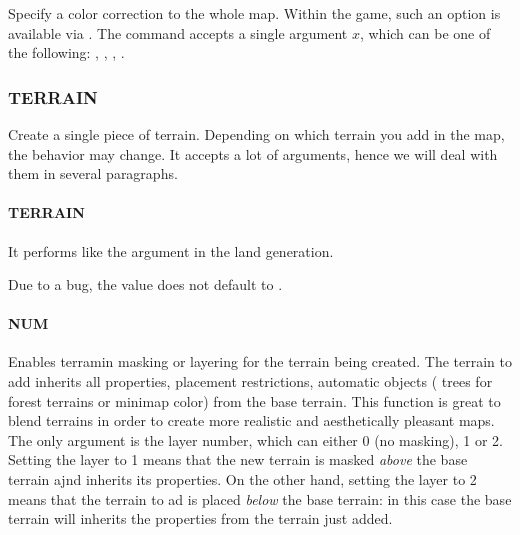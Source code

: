 \begin{appendices}
    \subsubsection{}

    Specify a color correction to the whole map. Within the game, such an option is available via . The command accepts a single argument $x$, which can be one of the following: , , , .

    \subsubsection{ TERRAIN}

    Create a single piece of terrain. Depending on which terrain you add in the map, the behavior may change. It accepts a lot of arguments, hence we will deal with them in several paragraphs.

    \paragraph{ TERRAIN}

    It performs like the argument in the land generation.

    \begin{attention}
        Due to a bug, the value does not default to .
    \end{attention}

    \paragraph{ NUM}

    Enables terramin masking or layering for the terrain being created. The terrain to add inherits all properties, placement restrictions, automatic objects (\eg{} trees for forest terrains or minimap color) from the base terrain. This function is great to blend terrains in order to create more realistic and aesthetically pleasant maps. The only argument is the layer number, which can either 0 (no masking), 1 or 2. Setting the layer to 1 means that the new terrain is masked \textit{above} the base terrain ajnd inherits its properties. On the other hand, setting the layer to 2 means that the terrain to ad is placed \textit{below} the base terrain: in this case the base terrain will inherits the properties from the terrain just added.


\end{appendices}
